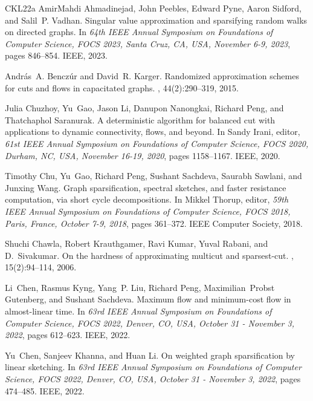 \documentclass[epsfig,letter,11pt]{article}
\numberwithin{equation}{section}
\begin{document}
\begin{thebibliography}{CKL{\etalchar{+}}22a}
AmirMahdi Ahmadinejad, John Peebles, Edward Pyne, Aaron Sidford, and Salil~P.
  Vadhan.
\newblock Singular value approximation and sparsifying random walks on directed
  graphs.
\newblock In {\em 64th {IEEE} Annual Symposium on Foundations of Computer
  Science, {FOCS} 2023, Santa Cruz, CA, USA, November 6-9, 2023}, pages
  846--854. {IEEE}, 2023.

Andr{\'{a}}s~A. Bencz{\'{u}}r and David~R. Karger.
\newblock Randomized approximation schemes for cuts and flows in capacitated
  graphs.
, 44(2):290--319, 2015.

Julia Chuzhoy, Yu~Gao, Jason Li, Danupon Nanongkai, Richard Peng, and
  Thatchaphol Saranurak.
\newblock A deterministic algorithm for balanced cut with applications to
  dynamic connectivity, flows, and beyond.
\newblock In Sandy Irani, editor, {\em 61st {IEEE} Annual Symposium on
  Foundations of Computer Science, {FOCS} 2020, Durham, NC, USA, November
  16-19, 2020}, pages 1158--1167. {IEEE}, 2020.

Timothy Chu, Yu~Gao, Richard Peng, Sushant Sachdeva, Saurabh Sawlani, and
  Junxing Wang.
\newblock Graph sparsification, spectral sketches, and faster resistance
  computation, via short cycle decompositions.
\newblock In Mikkel Thorup, editor, {\em 59th {IEEE} Annual Symposium on
  Foundations of Computer Science, {FOCS} 2018, Paris, France, October 7-9,
  2018}, pages 361--372. {IEEE} Computer Society, 2018.

Shuchi Chawla, Robert Krauthgamer, Ravi Kumar, Yuval Rabani, and D.~Sivakumar.
\newblock On the hardness of approximating multicut and sparsest-cut.
, 15(2):94--114, 2006.

Li~Chen, Rasmus Kyng, Yang~P. Liu, Richard Peng, Maximilian~Probst Gutenberg,
  and Sushant Sachdeva.
\newblock Maximum flow and minimum-cost flow in almost-linear time.
\newblock In {\em 63rd {IEEE} Annual Symposium on Foundations of Computer
  Science, {FOCS} 2022, Denver, CO, USA, October 31 - November 3, 2022}, pages
  612--623. {IEEE}, 2022.

Yu~Chen, Sanjeev Khanna, and Huan Li.
\newblock On weighted graph sparsification by linear sketching.
\newblock In {\em 63rd {IEEE} Annual Symposium on Foundations of Computer
  Science, {FOCS} 2022, Denver, CO, USA, October 31 - November 3, 2022}, pages
  474--485. {IEEE}, 2022.


\end{thebibliography}
\end{document}
